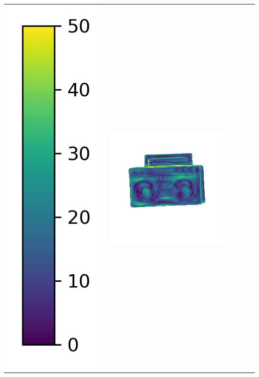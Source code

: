 \begin{tabularx}{\linewidth}{@{}Y@{}Y@{}Y@{}Y@{}Y@{}Y@{}}
\includegraphics[width=0.2\linewidth]{semisynthetic/colorbar_error_vertical.png} &
\includegraphics[width=\linewidth]{semisynthetic/20150514_19_ours_err.png} &

\end{tabularx}
